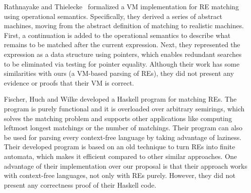 \documentclass[oneside,12pt]{scrbook}
\theoremstyle{definition}
\theoremstyle{plain}
\theoremstyle{definition}
\begin{document}
Rathnayake and Thielecke~\cite{Rathnayake2011} formalized a VM implementation for RE matching using operational semantics. Specifically, they derived a series of abstract machines, moving from the abstract definition of matching to realistic machines. First, a continuation is added to the operational semantics to describe what remains to be matched after the current expression. Next, they represented the expression as a data structure using pointers, which enables redundant searches to be eliminated via testing for pointer equality. Although their work has some similarities with ours (a VM-based parsing of REs), they did not present any evidence or proofs that their VM is correct.


Fischer, Huch and Wilke \cite{Fischer2010} developed a Haskell program for matching REs. The program is purely functional and it is overloaded over arbitrary semirings, which solves the matching problem and supports other applications like computing leftmost longest matchings or the number of matchings. Their program can also be used for parsing every context-free language by taking advantage of laziness. Their developed program is based on an old technique to turn REs into finite automata, which makes it efficient compared to other similar approaches. One advantage of their implementation over our proposal is that their approach works with context-free languages, not only with REs purely. However, they did not present any correctness proof of their Haskell code.


\end{document}
